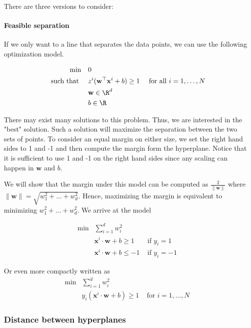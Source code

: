 There are three versions to consider:

\paragraph{Feasible separation}

If we only want to a line that separates the data points, we can use the following optimization model.

\begin{align*}
\min \quad & 0 \\
\text{ such that } \quad & z^i( \mathbf{w}^\top \mathbf{x}^i + b) \geq 1 & \text{ for all } i=1, \dots, N\\
& \mathbf{w}  \in \R^d\\
& b \in \R
\end{align*}

There may exist many solutions to this problem.  Thus, we are interested in the "best" solution.  Such a solution will maximize the separation between the two sets of points.  To consider an equal margin on either size, we set the right hand sides to 1 and -1 and then compute the margin form the hyperplane.  Notice that it is sufficient to use 1 and -1 on the right hand sides since any scaling can happen in $\mathbf{w}$ and $b$.

\begin{center}
\end{center}
We will show that the margin under this model can be computed as $\frac{2}{\|\mathbf{w}\|}$ where $\|\mathbf{w}\| = \sqrt{w_1^2 +  \dots + w_d^2}$.  Hence,  maximizing the margin is equivalent to minimizing $w_1^2 +  \dots + w_d^2$.  We arrive at the model

\begin{align}
\min & \sum_{i=1}^d w_i^2\\
&\mathbf{x}^i \cdot \mathbf{w} + b  \geq 1  & \text{ if } y_i = 1\\
&\mathbf{x}^i \cdot \mathbf{w} + b  \leq -1  & \text{ if } y_i = -1
\end{align}

Or even more compactly written as 
\begin{align}
\min & \sum_{i=1}^d w_i^2\\
&y_i(\mathbf{x}^i \cdot \mathbf{w} + b) \geq 1  & \text{ for } i=1, \dots, N
\end{align}



\subsubsection{Distance between hyperplanes}

